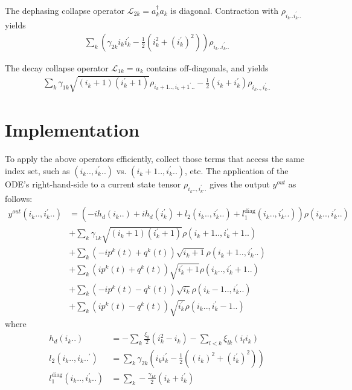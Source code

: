 \documentclass[letterpaper]{article}
\newcommand{\Ell}{\mathcal{L}}
\begin{document}
\begin{enumerate}
    The dephasing collapse operator $\Ell_{2k} = a_k^\dag a_k$ is diagonal. Contraction with $\rho_{i_k..i_k^\prime..}$ yields
    \begin{align}
        \sum_k \left( \gamma_{2k} i_ki_k^\prime - \frac 12 \left( i_k^2 + (i_k^\prime)^2\right) \right) \rho_{i_k..i_k^\prime..}
    \end{align}

    The decay collapse operator $\Ell_{1k} = a_k$ contains off-diagonals, and yields
    \begin{align}
        \sum_k \gamma_{1k} \sqrt{(i_k+1)(i_k^\prime+1)} \rho_{i_k+1.., i_k+1^\prime..} - \frac 12 \left( i_k+ i_k^\prime \right)\rho_{i_k.., i_k^\prime..} 
    \end{align}
      
\end{enumerate}

\section{Implementation}

  To apply the above operators efficiently, collect those terms that access the same index set, such as $(i_k..,i_k^\prime..)$ vs. $(i_k+1.., i_k^\prime..)$, etc. The application of the ODE's right-hand-side to a current state tensor $\rho_{i_k..,i_k^\prime..}$ gives the output $y^{out}$ as follows:
  \begin{align}
       y^{out}(i_k..,i_k^\prime..)  &= 
       \left(-i h_d(i_k..) + ih_d(i_k^\prime)
        + l_2(i_k..,i_k^\prime..) + l_1^{\text{diag}}(i_k.., i_k^\prime..) \right) \rho(i_k..,i_k^\prime..) \\
        &+ \sum_k \gamma_{1k} \sqrt{(i_k+1)(i_k^\prime+1)} \rho(i_k+1.., i_k^\prime +1..)\\
        &+ \sum_k \left(-ip^k(t) + q^k(t)\right) \sqrt{i_k+1} \rho(i_k+1.., i_k^\prime..) \\
        &+ \sum_k \left( ip^k(t) + q^k(t)\right) \sqrt{i_k^\prime+1} \rho(i_k..,i_k^\prime +1 ..) \\
        &+ \sum_k \left(-ip^k(t) - q^k(t)\right) \sqrt{i_k} \rho(i_k-1.., i_k^\prime..) \\
        &+ \sum_k \left( ip^k(t) - q^k(t)\right) \sqrt{i_k^\prime} \rho(i_k..,i_k^\prime -1 ..) 
  \end{align}
  where 
  \begin{align}
    h_d(i_k..) &= -\sum_k \frac{\xi_k}{2}(i_k^2 - i_k) - \sum_{l<k} \xi_{lk} (i_l i_k) \\
    l_2(i_k..,i_k..^\prime) &= \sum_k \gamma_{2k} \left(i_ki_k^\prime - \frac 12 \left( (i_k)^2 + (i_k^\prime)^2\right) \right)\\
    l_1^{\text{diag}}(i_k.., i_k^\prime..) &= \sum_k -\frac{\gamma_{1k}}{2}\left(i_k + i_k^\prime\right) 
  \end{align}
  
\end{document}
